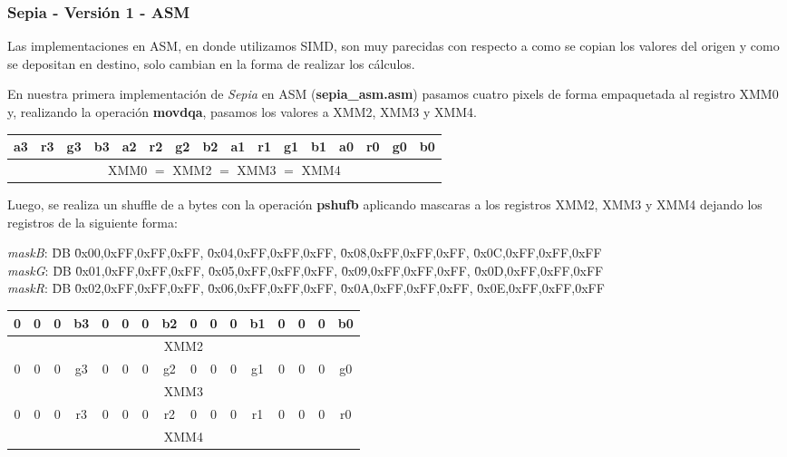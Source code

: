 \subsubsection{Sepia - Versión 1 - ASM}

Las implementaciones en ASM, en donde utilizamos SIMD, son muy parecidas con respecto a como se copian los valores del origen y como se depositan en destino, solo cambian en la forma de realizar los cálculos.

En nuestra primera implementación de \textit{Sepia} en ASM (\textbf{sepia_asm.asm}) pasamos cuatro pixels de forma empaquetada al registro XMM0 y, realizando la operación \textbf{movdqa}, pasamos los valores a XMM2, XMM3 y XMM4.

\begin{table}[h]
	\centering
	\begin{tabular}{| c | c | c | c | c | c | c | c | c | c | c | c | c | c | c | c |}
		\hline
		a3 & r3 & g3 & b3 & a2 & r2 & g2 & b2 & a1 & r1 & g1 & b1 & a0 & r0 & g0 & b0  \\ \hline
		\multicolumn{16}{c}{XMM0 $=$ XMM2 $=$ XMM3 $=$ XMM4} \\
	\end{tabular}
\end{table}

Luego, se realiza un shuffle de a bytes con la operación \textbf{pshufb} aplicando mascaras a los registros XMM2, XMM3 y XMM4 dejando los registros de la siguiente forma:

\begin{tabbing}
	\textit{maskB}: \= DB \= 0x00,0xFF,0xFF,0xFF, \= 0x04,0xFF,0xFF,0xFF, \= 0x08,0xFF,0xFF,0xFF, \= 0x0C,0xFF,0xFF,0xFF \\
	\textit{maskG}: \= DB \= 0x01,0xFF,0xFF,0xFF, \= 0x05,0xFF,0xFF,0xFF, \= 0x09,0xFF,0xFF,0xFF, \= 0x0D,0xFF,0xFF,0xFF \\
	\textit{maskR}: \= DB \= 0x02,0xFF,0xFF,0xFF, \= 0x06,0xFF,0xFF,0xFF, \= 0x0A,0xFF,0xFF,0xFF, \= 0x0E,0xFF,0xFF,0xFF \\
\end{tabbing}

\begin{table}[h]
	\centering
	\begin{tabular}{| c | c | c | c | c | c | c | c | c | c | c | c | c | c | c | c |}
		\hline
		0 & 0 & 0 & b3 & 0 & 0 & 0 & b2 & 0 & 0 & 0 & b1 & 0 & 0 & 0 & 
		b0  \\ \hline
		\multicolumn{16}{c}{XMM2} \\
		\hline
		0 & 0 & 0 & g3 & 0 & 0 & 0 & g2 & 0 & 0 & 0 & g1 & 0 & 0 & 0 & g0  \\ \hline
		\multicolumn{16}{c}{XMM3} \\
		\hline
		0 & 0 & 0 & r3 & 0 & 0 & 0 & r2 & 0 & 0 & 0 & r1 & 0 & 0 & 0 & r0  \\ \hline
		\multicolumn{16}{c}{XMM4} \\
	\end{tabular}
\end{table}


